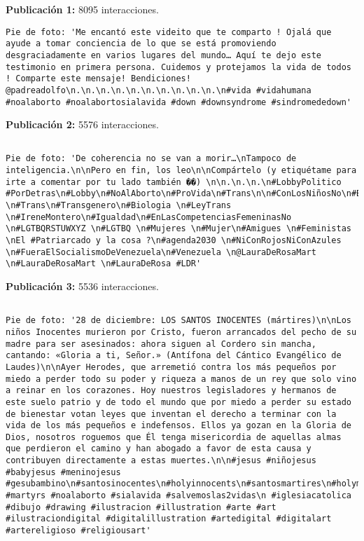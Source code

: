 \documentclass{article}
\begin{document}
\textbf{Publicación 1:} 8095 interacciones.
\cprotect\begin{verbatim}
Pie de foto: 'Me encantó este videito que te comparto ! Ojalá que ayude a tomar conciencia de lo que se está promoviendo desgraciadamente en varios lugares del mundo… Aquí te dejo este testimonio en primera persona. Cuidemos y protejamos la vida de todos ! Comparte este mensaje! Bendiciones! @padreadolfo\n.\n.\n.\n.\n.\n.\n.\n.\n.\n.\n#vida #vidahumana #noalaborto #noalabortosialavida #down #downsyndrome #sindromededown'
\end{verbatim}
\textbf{Publicación 2:} 5576 interacciones.
\cprotect\begin{verbatim}

Pie de foto: 'De coherencia no se van a morir…\nTampoco de inteligencia.\n\nPero en fin, los leo\n\nCompártelo (y etiquétame para irte a comentar por tu lado también ��) \n\n.\n.\n.\n#LobbyPolitico #PorDetras\n#Lobby\n#NoAlAborto\n#ProVida\n#Trans\n\n#ConLosNiñosNo\n#Balenciaga \n#Trans\n#Transgenero\n#Biologia \n#LeyTrans \n#IreneMontero\n#Igualdad\n#EnLasCompetenciasFemeninasNo \n#LGTBQRSTUWXYZ \n#LGTBQ \n#Mujeres \n#Mujer\n#Amigues \n#Feministas \nEl #Patriarcado y la cosa ?\n#agenda2030 \n#NiConRojosNiConAzules \n#FueraElSocialismoDeVenezuela\n#Venezuela \n@LauraDeRosaMart \n#LauraDeRosaMart \n#LauraDeRosa #LDR'
\end{verbatim}

\textbf{Publicación 3:} 5536 interacciones.
\cprotect\begin{verbatim}

Pie de foto: '28 de diciembre: LOS SANTOS INOCENTES (mártires)\n\nLos niños Inocentes murieron por Cristo, fueron arrancados del pecho de su madre para ser asesinados: ahora siguen al Cordero sin mancha, cantando: «Gloria a ti, Señor.» (Antífona del Cántico Evangélico de Laudes)\n\nAyer Herodes, que arremetió contra los más pequeños por miedo a perder todo su poder y riqueza a manos de un rey que solo vino a reinar en los corazones. Hoy nuestros legisladores y hermanos de este suelo patrio y de todo el mundo que por miedo a perder su estado de bienestar votan leyes que inventan el derecho a terminar con la vida de los más pequeños e indefensos. Ellos ya gozan en la Gloria de Dios, nosotros roguemos que Él tenga misericordia de aquellas almas que perdieron el camino y han abogado a favor de esta causa y contribuyen directamente a estas muertes.\n\n#jesus #niñojesus #babyjesus #meninojesus #gesubambino\n#santosinocentes\n#holyinnocents\n#santosmartires\n#holymartyrs\n#martires #martyrs #noalaborto #sialavida #salvemoslas2vidas\n #iglesiacatolica #dibujo #drawing #ilustracion #illustration #arte #art #ilustraciondigital #digitalillustration #artedigital #digitalart #artereligioso #religiousart'
\end{verbatim}
\end{document}
